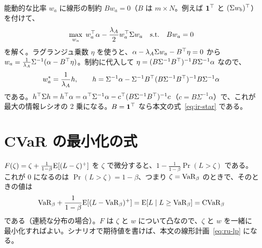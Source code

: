 能動的な比率 $w_a$ に線形の制約 $Bw_a=0$（$B$ は $m\times N$。例えば $\mathbf{1}^{\top}$ と $(\Sigma w_b)^{\top}$）を付けて、
\begin{equation}
\max_{w_a}\;w_a^{\top}\alpha-\frac{\lambda_A}{2}w_a^{\top}\Sigma w_a\quad\text{s.t.}\quad Bw_a=0
\end{equation}
を解く。ラグランジュ乗数 $\eta$ を使うと、$\alpha-\lambda_A\Sigma w_a-B^{\top}\eta=0$ から $w_a=\frac{1}{\lambda_A}\Sigma^{-1}(\alpha-B^{\top}\eta)$。制約に代入して $\eta=(B\Sigma^{-1}B^{\top})^{-1}B\Sigma^{-1}\alpha$ なので、
\begin{equation}
w_a^*=\frac{1}{\lambda_A}h,\qquad h=\Sigma^{-1}\alpha-\Sigma^{-1}B^{\top}(B\Sigma^{-1}B^{\top})^{-1}B\Sigma^{-1}\alpha
\end{equation}
である。$h^{\top}\Sigma h=h^{\top}\alpha=\alpha^{\top}\Sigma^{-1}\alpha-c^{\top}(B\Sigma^{-1}B^{\top})^{-1}c$（$c=B\Sigma^{-1}\alpha$）で、これが最大の情報レシオの 2 乗になる。$B=\mathbf{1}^{\top}$ なら本文の式~\eqref{eq:ir-star} である。

\section{CVaR の最小化の式}

$F(\zeta)=\zeta+\frac{1}{1-\beta}\mathrm{E}[(L-\zeta)^+]$ を $\zeta$ で微分すると、$1-\frac{1}{1-\beta}\Pr(L>\zeta)$ である。これが 0 になるのは $\Pr(L>\zeta)=1-\beta$、つまり $\zeta=\mathrm{VaR}_\beta$ のときで、そのときの値は
\begin{equation}
\mathrm{VaR}_\beta+\frac{1}{1-\beta}\mathrm{E}[(L-\mathrm{VaR}_\beta)^+]=\mathrm{E}[L\mid L\ge\mathrm{VaR}_\beta]=\mathrm{CVaR}_\beta
\end{equation}
である（連続な分布の場合）。$F$ は $\zeta$ と $w$ について凸なので、$\zeta$ と $w$ を一緒に最小化すればよい。シナリオで期待値を書けば、本文の線形計画~\eqref{eq:ru-lp} になる。
